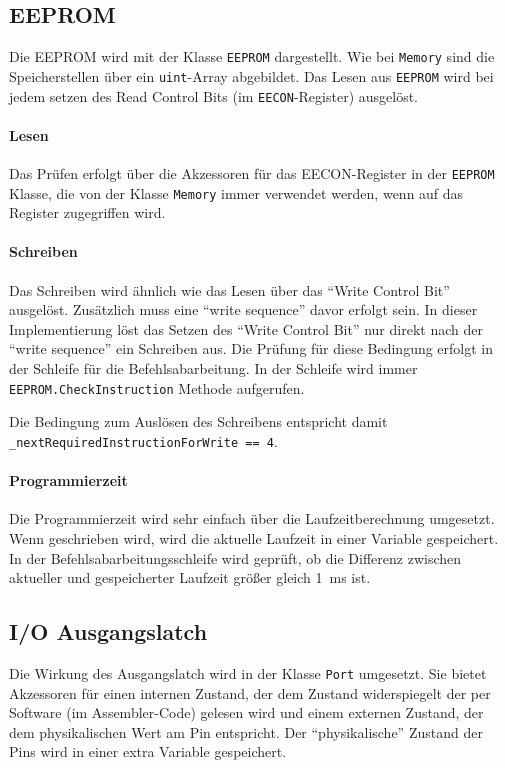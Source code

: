 \subsection{EEPROM}
Die EEPROM wird mit der Klasse \texttt{EEPROM} dargestellt.
Wie bei \texttt{Memory} sind die Speicherstellen über ein \texttt{uint}-Array abgebildet.
Das Lesen aus \texttt{EEPROM} wird bei jedem setzen des Read Control Bits (im \texttt{EECON}-Register) ausgelöst.

\paragraph{Lesen}
Das Prüfen erfolgt über die Akzessoren für das {EECON}-Register in der \texttt{EEPROM} Klasse,
die von der Klasse \texttt{Memory} immer verwendet werden, wenn auf das Register zugegriffen wird.

\paragraph{Schreiben}
Das Schreiben wird ähnlich wie das Lesen über das \enquote{Write Control Bit} ausgelöst.
Zusätzlich muss eine \enquote{write sequence} davor erfolgt sein.
In dieser Implementierung löst das Setzen des \enquote{Write Control Bit} nur direkt nach der \enquote{write sequence} ein Schreiben aus.
Die Prüfung für diese Bedingung erfolgt in der Schleife für die Befehlsabarbeitung.
In der Schleife wird immer \texttt{EEPROM.CheckInstruction} Methode aufgerufen.


Die Bedingung zum Auslösen des Schreibens entspricht damit \texttt{\_nextRequiredInstructionForWrite == 4}.


\paragraph{Programmierzeit}
Die Programmierzeit wird sehr einfach über die Laufzeitberechnung umgesetzt.
Wenn geschrieben wird, wird die aktuelle Laufzeit in einer Variable gespeichert.
In der Befehlsabarbeitungsschleife wird geprüft,
ob die Differenz zwischen aktueller und gespeicherter Laufzeit größer gleich 1~ms ist. 


\subsection{I/O Ausgangslatch}
Die Wirkung des Ausgangslatch wird in der Klasse \texttt{Port} umgesetzt.
Sie bietet Akzessoren für einen internen Zustand,
der dem Zustand widerspiegelt der per Software (im Assembler-Code) gelesen wird
und einem externen Zustand,
der dem physikalischen Wert am Pin entspricht.
Der \enquote{physikalische} Zustand der Pins wird in einer extra Variable gespeichert.


